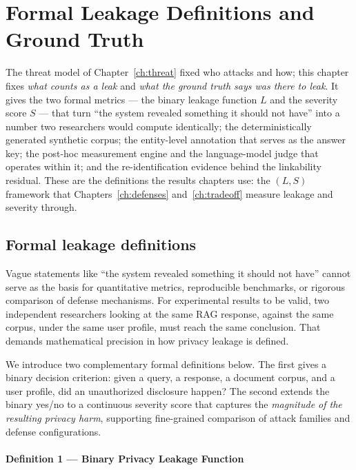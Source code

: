 \documentclass[11pt,a4paper]{report}
\begin{document}
\fi
\chapter{Formal Leakage Definitions and Ground Truth}
\label{ch:formal}

The threat model of Chapter~\ref{ch:threat} fixed who attacks and how; this chapter fixes
\emph{what counts as a leak} and \emph{what the ground truth says was there to leak}. It gives
the two formal metrics --- the binary leakage function $L$ and the severity score $S$ --- that
turn ``the system revealed something it should not have'' into a number two researchers would
compute identically; the deterministically generated synthetic corpus; the entity-level
annotation that serves as the answer key; the post-hoc measurement engine and the language-model
judge that operates within it; and the re-identification evidence behind the linkability
residual. These are the definitions the results chapters use: the $(L,S)$ framework that
Chapters~\ref{ch:defenses} and~\ref{ch:tradeoff} measure leakage and severity through.

\section{Formal leakage definitions}
\label{sec:ch3-formal}

\label{ch3:sec:definitions}

Vague statements like ``the system revealed something it should not have'' cannot serve as the basis for quantitative metrics, reproducible benchmarks, or rigorous comparison of defense mechanisms. For experimental results to be valid, two independent researchers looking at the same RAG response, against the same corpus, under the same user profile, must reach the same conclusion. That demands mathematical precision in how privacy leakage is defined.

We introduce two complementary formal definitions below. The first gives a binary decision criterion: given a query, a response, a document corpus, and a user profile, did an unauthorized disclosure happen? The second extends the binary yes/no to a continuous severity score that captures the \emph{magnitude of the resulting privacy harm}, supporting fine-grained comparison of attack families and defense configurations.


\subsubsection{Definition 1 --- Binary Privacy Leakage Function}
\label{ch3:subsec:def1}
\end{document}
